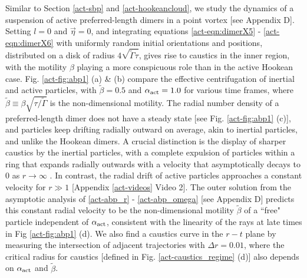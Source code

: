 \documentclass[../Rajarshi-thesis-draft.tex]{subfiles}
\begin{document}
Similar to Section \ref{act-sbp} and \ref{act-hookeancloud}, we study the dynamics of a suspension of active preferred-length dimers in a point vortex [see Appendix D]. Setting $l = 0$ and $\vec{\eta} = 0$, and integrating equations \eqref{act-eqn:dimerX5} - \eqref{act-eqn:dimerX6} with uniformly random initial orientations and positions, distributed on a disk of radius $4\sqrt{\tilde{\Gamma} \tau}$, gives rise to caustics in the inner region, with the motility $\beta$ playing a more conspicuous role than in the active Hookean case. Fig. \ref{act-fig:abp1} (a) \& (b) compare the effective centrifugation of inertial and active particles, with $\tilde{\beta}=0.5$ and $\alpha_{\rm act}=1.0$ for various time frames, where $\tilde{\beta} \equiv \beta \sqrt{\tau/{\tilde{\Gamma}}}$ is the non-dimensional motility. The radial number density of a preferred-length dimer does not have a steady state [see Fig. \ref{act-fig:abp1} (c)], and particles keep drifting radially outward on average, akin to inertial particles, and unlike the Hookean dimers. A crucial distinction is the display of sharper caustics by the inertial particles, with a complete expulsion of particles within a ring that expands radially outwards with a velocity that asymptotically decays to $0$ as $r \to \infty$ \cite{Croor2015}. In contrast, the radial drift of active particles approaches a constant velocity for $r \gg 1$ [Appendix \ref{act-videos} Video 2]. The outer solution from the asymptotic analysis of \eqref{act-abp_r} - \eqref{act-abp_omega} [see Appendix D] predicts this constant radial velocity to be the non-dimensional motility $\tilde{\beta}$ of a ``free" particle independent of $\alpha_{\rm act}$, consistent with the linearity of the rays at late times in Fig \ref{act-fig:abp1} (d). We also find a caustics curve in the $r-t$ plane by measuring the intersection of adjacent trajectories with $\Delta r = 0.01$, where the critical radius for caustics [defined in Fig. \ref{act-caustics_regime} (d)] also depends on $\alpha_{\rm act}$ and $\tilde{\beta}$.
\end{document}
